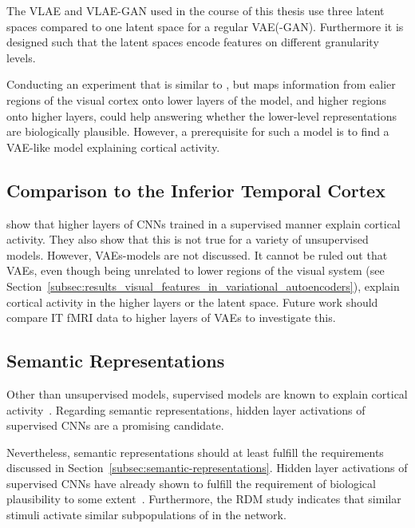 The \ac{VLAE} and \ac{VLAE}-\ac{GAN} used in the course of this thesis use three latent spaces compared to one latent space for a regular \ac{VAE}(-\ac{GAN}).
Furthermore it is designed such that the latent spaces encode features on different granularity levels.

Conducting an experiment that is similar to \citet{vanrullen2019reconstructing}, but maps information from ealier regions of the visual cortex onto lower layers of the model, and higher regions onto higher layers, could help answering whether the lower-level representations are biologically plausible.
However, a prerequisite for such a model is to find a \ac{VAE}-like model explaining cortical activity.

\subsection{Comparison to the Inferior Temporal Cortex}\label{subsec:representational-dissimilarity-matrices}
\citet{khaligh2014deep} show that higher layers of \acp{CNN} trained in a supervised manner explain cortical activity.
They also show that this is not true for a variety of unsupervised models.
However, \acp{VAE}-models are not discussed.
It cannot be ruled out that \acp{VAE}, even though being unrelated to lower regions of the visual system (see Section~\ref{subsec:results_visual_features_in_variational_autoencoders}), explain cortical activity in the higher layers or the latent space.
Future work should compare \ac{IT} fMRI data to higher layers of \acp{VAE} to investigate this.

\subsection{Semantic Representations}\label{subsec:semantic-representations-results}
Other than unsupervised models, supervised models are known to explain cortical activity~\citep{khaligh2014deep,cadieu2014deep}.
Regarding semantic representations, hidden layer activations of supervised \acp{CNN} are a promising candidate.

Nevertheless, semantic representations should at least fulfill the requirements discussed in Section~\ref{subsec:semantic-representations}.
Hidden layer activations of supervised \acp{CNN} have already shown to fulfill the requirement of biological plausibility to some extent~\citep{khaligh2014deep}.
Furthermore, the \ac{RDM} study indicates that similar stimuli activate similar subpopulations of  in the network.

